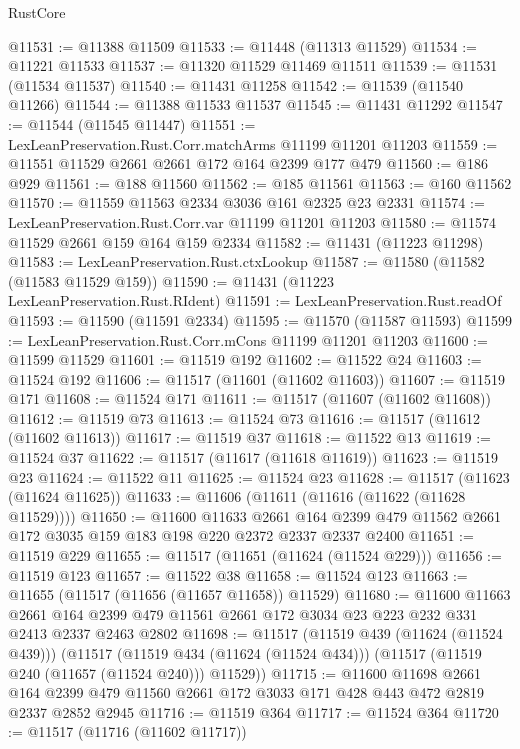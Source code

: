 \begin{lexlean}{RustCore}
\begin{coremodule}
@11531 := @11388 @11509
@11533 := @11448 (@11313 @11529)
@11534 := @11221 @11533
@11537 := @11320 @11529 @11469 @11511
@11539 := @11531 (@11534 @11537)
@11540 := @11431 @11258
@11542 := @11539 (@11540 @11266)
@11544 := @11388 @11533 @11537
@11545 := @11431 @11292
@11547 := @11544 (@11545 @11447)
@11551 := LexLeanPreservation.Rust.Corr.matchArms @11199 @11201 @11203
@11559 := @11551 @11529 @2661 @2661 @172 @164 @2399 @177 @479
@11560 := @186 @929
@11561 := @188 @11560
@11562 := @185 @11561
@11563 := @160 @11562
@11570 := @11559 @11563 @2334 @3036 @161 @2325 @23 @2331
@11574 := LexLeanPreservation.Rust.Corr.var @11199 @11201 @11203
@11580 := @11574 @11529 @2661 @159 @164 @159 @2334
@11582 := @11431 (@11223 @11298)
@11583 := LexLeanPreservation.Rust.ctxLookup
@11587 := @11580 (@11582 (@11583 @11529 @159))
@11590 := @11431 (@11223 LexLeanPreservation.Rust.RIdent)
@11591 := LexLeanPreservation.Rust.readOf
@11593 := @11590 (@11591 @2334)
@11595 := @11570 (@11587 @11593)
@11599 := LexLeanPreservation.Rust.Corr.mCons @11199 @11201 @11203
@11600 := @11599 @11529
@11601 := @11519 @192
@11602 := @11522 @24
@11603 := @11524 @192
@11606 := @11517 (@11601 (@11602 @11603))
@11607 := @11519 @171
@11608 := @11524 @171
@11611 := @11517 (@11607 (@11602 @11608))
@11612 := @11519 @73
@11613 := @11524 @73
@11616 := @11517 (@11612 (@11602 @11613))
@11617 := @11519 @37
@11618 := @11522 @13
@11619 := @11524 @37
@11622 := @11517 (@11617 (@11618 @11619))
@11623 := @11519 @23
@11624 := @11522 @11
@11625 := @11524 @23
@11628 := @11517 (@11623 (@11624 @11625))
@11633 := @11606 (@11611 (@11616 (@11622 (@11628 @11529))))
@11650 := @11600
    @11633
    @2661
    @164
    @2399
    @479
    @11562
    @2661
    @172
    @3035
    @159
    @183
    @198
    @220
    @2372
    @2337
    @2337
    @2400
@11651 := @11519 @229
@11655 := @11517 (@11651 (@11624 (@11524 @229)))
@11656 := @11519 @123
@11657 := @11522 @38
@11658 := @11524 @123
@11663 := @11655 (@11517 (@11656 (@11657 @11658)) @11529)
@11680 := @11600
    @11663
    @2661
    @164
    @2399
    @479
    @11561
    @2661
    @172
    @3034
    @23
    @223
    @232
    @331
    @2413
    @2337
    @2463
    @2802
@11698 := @11517
    (@11519 @439 (@11624 (@11524 @439)))
    (@11517
      (@11519 @434 (@11624 (@11524 @434)))
      (@11517 (@11519 @240 (@11657 (@11524 @240))) @11529))
@11715 := @11600
    @11698
    @2661
    @164
    @2399
    @479
    @11560
    @2661
    @172
    @3033
    @171
    @428
    @443
    @472
    @2819
    @2337
    @2852
    @2945
@11716 := @11519 @364
@11717 := @11524 @364
@11720 := @11517 (@11716 (@11602 @11717))

\end{coremodule}
\end{lexlean}
